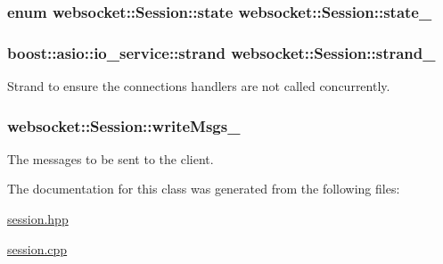 \subsubsection[{\texorpdfstring{state\+\_\+}{state_}}]{\setlength{\rightskip}{0pt plus 5cm}enum {\bf websocket\+::\+Session\+::state}  websocket\+::\+Session\+::state\+\_\+}\hypertarget{classwebsocket_1_1Session_a8f9e0d65f4de675dd7b8242e17ee29b7}{}\label{classwebsocket_1_1Session_a8f9e0d65f4de675dd7b8242e17ee29b7}
\subsubsection[{\texorpdfstring{strand\+\_\+}{strand_}}]{\setlength{\rightskip}{0pt plus 5cm}boost\+::asio\+::io\+\_\+service\+::strand websocket\+::\+Session\+::strand\+\_\+\hspace{0.3cm}{\ttfamily [private]}}\hypertarget{classwebsocket_1_1Session_a394bb9b578c166e22b2a630b8ea013fb}{}\label{classwebsocket_1_1Session_a394bb9b578c166e22b2a630b8ea013fb}


Strand to ensure the connection\textquotesingle{}s handlers are not called concurrently. 

\subsubsection[{\texorpdfstring{write\+Msgs\+\_\+}{writeMsgs_}}]{ websocket\+::\+Session\+::write\+Msgs\+\_\+\hspace{0.3cm}{\ttfamily [private]}}\hypertarget{classwebsocket_1_1Session_ace231022157030f4d56de9bfeff43ac7}{}\label{classwebsocket_1_1Session_ace231022157030f4d56de9bfeff43ac7}


The messages to be sent to the client. 



The documentation for this class was generated from the following files\+:\begin{DoxyCompactItemize}
\item 
\hyperlink{session_8hpp}{session.\+hpp}\item 
\hyperlink{session_8cpp}{session.\+cpp}\end{DoxyCompactItemize}
